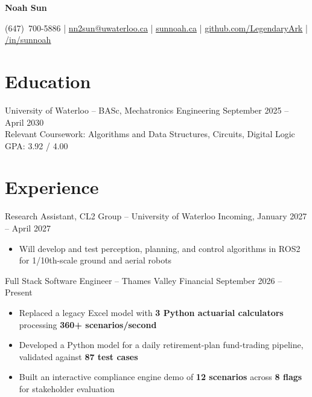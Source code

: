 \documentclass[11pt]{article}       %
\newcommand{\textsb}[1]{{\fontseries{sb}\selectfont #1}}
\newcommand{\icon}[1]{\raisebox{0em}{#1}}
\begin{document}
\centerline{\huge \textbf{Noah Sun}}

\vspace{-6pt}

\begin{center}
(647)~700-5886 \;|\;
\href{mailto:nn2sun@uwaterloo.ca}{nn2sun@uwaterloo.ca} \;|\;
\href{https://www.sunnoah.ca}{\underline{sunnoah.ca}} \;|\;
\href{https://github.com/LegendaryArk}{\underline{github.com/LegendaryArk}} \;|\;
\href{https://www.linkedin.com/in/sunnoah/}{\underline{/in/sunnoah}}
\end{center}

\vspace{-9pt}

\section*{Education}
\textsb{University of Waterloo} -- BASc, Mechatronics Engineering \hfill September 2025 -- April 2030 \\[2pt]
\hspace{12pt} Relevant Coursework: Algorithms and Data Structures, Circuits, Digital Logic \hfill GPA: 3.92 / 4.00 \\

\section*{Experience}

\textsb{Research Assistant, CL2 Group} -- University of Waterloo \hfill Incoming, January 2027 -- April 2027 \\
\begin{itemize}
    \item Will develop and test perception, planning, and control algorithms in ROS2 for 1/10th-scale ground and aerial robots
\end{itemize}

\vspace{6pt}

\textsb{Full Stack Software Engineer} -- Thames Valley Financial \hfill September 2026 -- Present \\
\begin{itemize}
    \item Replaced a legacy Excel model with \textbf{3 Python actuarial calculators} processing \textbf{360+ scenarios/second}
    \item Developed a Python model for a daily retirement-plan fund-trading pipeline, validated against \textbf{87 test cases}
    \item Built an interactive compliance engine demo of \textbf{12 scenarios} across \textbf{8 flags} for stakeholder evaluation
\end{itemize}
\end{document}
